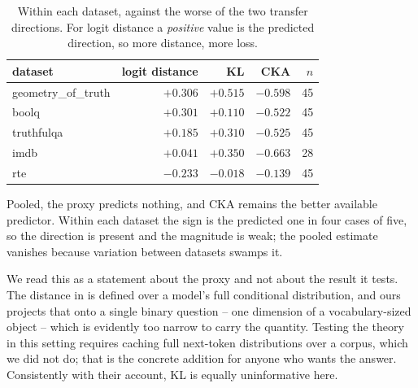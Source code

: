 \begin{table}[h]
\centering
\small
\begin{tabular}{@{}lrrrr@{}}
\toprule
dataset & logit distance & KL & CKA & $n$ \\
\midrule
geometry\_of\_truth & $+0.306$ & $+0.515$ & $-0.598$ & 45 \\
boolq               & $+0.301$ & $+0.110$ & $-0.522$ & 45 \\
truthfulqa          & $+0.185$ & $+0.310$ & $-0.525$ & 45 \\
imdb                & $+0.041$ & $+0.350$ & $-0.663$ & 28 \\
rte                 & $-0.233$ & $-0.018$ & $-0.139$ & 45 \\
\bottomrule
\end{tabular}
\caption{Within each dataset, against the worse of the two transfer directions.
For logit distance a \emph{positive} value is the predicted direction, so more
distance, more loss.}
\label{tab:logit-bydataset}
\end{table}

Pooled, the proxy predicts nothing, and CKA remains the better available
predictor. Within each dataset the sign is the predicted one in four cases of
five, so the direction is present and the magnitude is weak; the pooled estimate
vanishes because variation between datasets swamps it.

We read this as a statement about the proxy and not about the result it tests.
The distance in \citet{nielsen2026logit} is defined over a model's full
conditional distribution, and ours projects that onto a single binary question --
one dimension of a vocabulary-sized object -- which is evidently too narrow to
carry the quantity. Testing the theory in this setting requires caching full
next-token distributions over a corpus, which we did not do; that is the concrete
addition for anyone who wants the answer. Consistently with their account, KL is
equally uninformative here.

